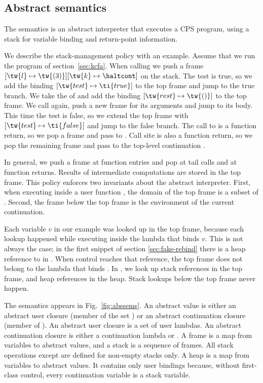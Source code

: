 \documentclass{LMCS}
\theoremstyle{definition} \newtheorem{property}[thm]{Property}
\begin{document}
\subsection{Abstract semantics\label{sec:abssems}}

The \cfat{} semantics is an abstract interpreter that executes a CPS program,
using a stack for variable binding and return-point information.

We describe the stack-management policy with an example.
Assume that we run the  program of section~\ref{sec:kcfa}.
When calling  we push a frame 
$[\tw{l} \mapsto \tw{(3)}][\tw{k} \mapsto \haltcont]$ on the stack.
The test   is true, so we add the binding 
$[\tw{test} \mapsto \ti{true}]$ to the top frame and jump to the true branch.
We take the  of  and add the binding $[\tw{rest} \mapsto \tw{()}]$
to the top frame.
We call  again, push a new frame for its arguments and jump to its body.
This time the test is false, so we extend the top frame with
$[\tw{test} \mapsto \ti{false}]$ and jump to the false branch.
The call to  is a function return, so we pop a frame and pass  
to .
Call site  is also a function return, so we pop the remaining 
frame and pass  to the top-level continuation \haltcont.

In general, we push a frame at function entries and pop at tail calls and at
function returns.
Results of intermediate computations are stored in the top frame.
This policy enforces two invariants about the abstract interpreter.
First, when executing inside a user function \pulam, the domain of the top frame
is a subset of .
Second, the frame below the top frame is the environment of the current
continuation.

Each variable $v$ in our example was looked up in the top frame,
because each lookup happened while executing inside the lambda that binds $v$.
This is not always the case; in the first snippet of section
\ref{sec:fake-rebind} there is a heap reference to  in .
When control reaches that reference, the top frame does not belong to the
lambda that binds .
In \cfat, we look up stack references in the top frame, and heap references in 
the heap.
Stack lookups below the top frame never happen.

The \cfat{} semantics appears in Fig.~\ref{fig:abssems}.
An abstract value is either an abstract user closure (member of the 
set \dauclos) or an abstract continuation closure (member of \dacclos).
An abstract user closure is a set of user lambdas.
An abstract continuation closure is either a continuation lambda or \haltcont.
A frame is a map from variables to abstract values, 
and a stack is a sequence of frames.
All stack operations except \pushNA{} are defined for non-empty stacks only.
A heap is a map from variables to abstract values.
It contains only user bindings because, without first-class control, every 
continuation variable is a stack variable.
\end{document}
